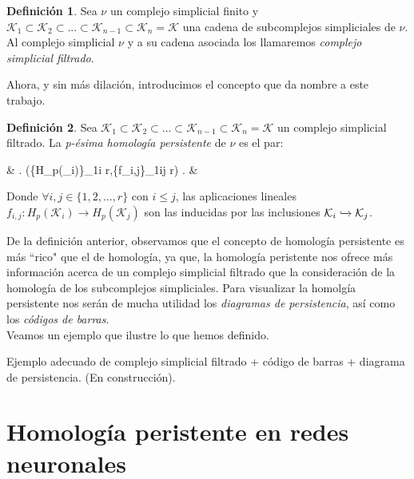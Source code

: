 \documentclass[12pt, a4paper]{article}
\numberwithin{equation}{section}
\theoremstyle{definition}
\newtheorem{defi}{Definición}
\newenvironment{ejem}
  {\pushQED{\qed}\renewcommand{\qedsymbol}{$\blacktriangleleft$}\ejemplo}
  {\popQED\endejemplo}
\theoremstyle{remark}
\theoremstyle{plain}
\begin{document}
		\begin{defi}
		
			Sea {\Large $\nu$} un complejo simplicial finito y $\mathcal{K}_{1}\subset\mathcal{K}_{2}\subset...\subset\mathcal{K}_{n-1}\subset\mathcal{K}_{n}=\mathcal{K}$
			una cadena de subcomplejos simpliciales de {\Large $\nu$}. Al complejo simplicial {\Large $\nu$} y a su cadena asociada los llamaremos \textit{complejo simplicial filtrado}.

		\end{defi}

		Ahora, y sin más dilación, introducimos el concepto que da nombre a este trabajo.

		\begin{defi}
		
			Sea $\mathcal{K}_{1}\subset\mathcal{K}_{2}\subset...\subset\mathcal{K}_{n-1}\subset\mathcal{K}_{n}=\mathcal{K}$ un complejo simplicial filtrado. La 
			\textit{p-ésima homología persistente} de {\Large $\nu$} es el par:
			\begin{flalign*}
				& \left.	
				(\{H_{p}(_{i})\}_{1\leq i \leq r},\{f_{i,j}\}_{1\leq i\leq j \leq r})
				\right. &
			\end{flalign*}
			Donde $\forall i,j \in \{1,2,...,r\}$ con $i \leq j$, las aplicaciones lineales 
			$f_{i,j}:H_{p}(\mathcal{K}_{i})\rightarrow H_{p}(\mathcal{K}_{j})$ son las inducidas por las inclusiones $\mathcal{K}_{i}\xhookrightarrow{} \mathcal{K}_{j}$.
	

		\end{defi}
		
		

		De la definición anterior, observamos que el concepto de homología persistente es más ``rico" que el de homología, ya que, la homología peristente nos ofrece más
		información acerca de un complejo simplicial filtrado que la consideración de la homología de los subcomplejos simpliciales. Para visualizar la homolgía persistente
		nos serán de mucha utilidad los \textit{diagramas de persistencia}, así como los \textit{códigos de barras}.\\
		Veamos un ejemplo que ilustre lo que hemos definido.
		
		\begin{ejem}	
			Ejemplo adecuado de complejo simplicial filtrado + código de barras + diagrama de persistencia. (En construcción).
		\end{ejem}

	\section{Homología peristente en redes neuronales}
\end{document}
